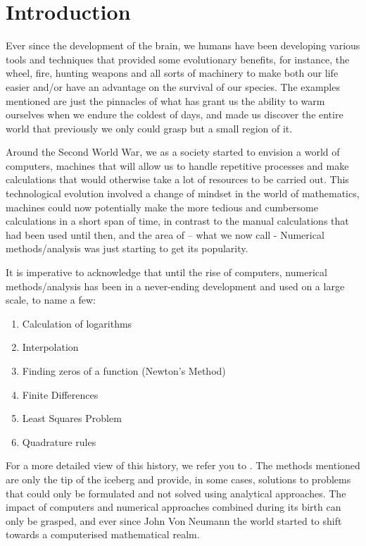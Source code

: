 \chapter{Introduction}

Ever since the development of the brain, we humans have been developing various tools and techniques that provided some evolutionary benefits, for instance, the wheel, fire, hunting weapons and all sorts of machinery to make both our life easier and/or have an advantage on the survival of our species. The examples mentioned are just the pinnacles of what has grant us the ability to warm ourselves when we endure the coldest of days, and made us discover the entire world that previously we only could grasp but a small region of it.

Around the Second World War, we as a society started to envision a world of computers, machines that will allow us to handle repetitive processes and make calculations that would otherwise take a lot of resources to be carried out. This technological evolution involved a change of mindset in the world of mathematics, machines could now potentially make the more tedious and cumbersome calculations in a short span of time, in contrast to the manual calculations that had been used until then, and the area of – what we now call - Numerical methods/analysis was just starting to get its popularity.

It is imperative to acknowledge that until the rise of computers, numerical methods/analysis has been in a never-ending development and used on a large scale, to name a few:
\begin{enumerate}
    \item Calculation of logarithms
    \item Interpolation
    \item Finding zeros of a function (Newton's Method)
    \item Finite Differences
    \item Least Squares Problem
    \item Quadrature rules
\end{enumerate}

For a more detailed view of this history, we refer you to \cite{goldstine2012history}. The methods mentioned are only the tip of the iceberg and provide, in some cases, solutions to problems that could only be formulated and not solved using analytical approaches. 
The impact of computers and numerical approaches combined during its birth can only be grasped, and ever since John Von Neumann the world started to shift towards a computerised mathematical realm. 

